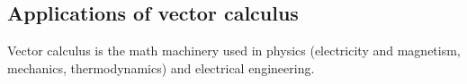 



	\subsection{Applications of vector calculus}

		Vector calculus is the math machinery used in physics
		(electricity and magnetism, mechanics, thermodynamics)
		and electrical engineering.
		
		